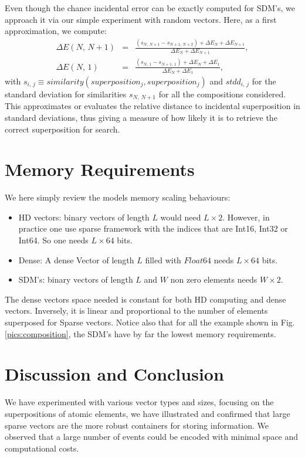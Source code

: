 \documentclass[11pt]{article}
\begin{document}
Even though the chance incidental error can be exactly
computed for SDM's, we approach it via our simple experiment with random vectors.
Here, as a first approximation, we compute:
\begin{eqnarray*}
\Delta E(N,\, N+1) &=& \frac{(s_{N,\, N+1} - s_{N+1,\, N+2}) + \Delta E_{N} + \Delta E_{N+1} } {\Delta E_{N} + \Delta E_{N+1}}, \\
\Delta E(N,\, 1) & = & \frac{(s_{N,\, 1} - s_{N+1,\, 1}) + \Delta E_{N} + \Delta E_{1}}{\Delta E_{N} + \Delta E_{1}},
\end{eqnarray*}
with $s_{i, \, j} \equiv similarity(superposition_j, superposition_{j})$ and $stdd_{i,\, j}$
for the standard deviation for similarities $s_{N, \, N+1}$ for all the  compositions considered.
This approximates or evaluates the relative distance to incidental superposition in  standard deviations, thus giving a measure of how likely it is to retrieve the correct superposition for search. 


\section{Memory Requirements}
We here simply review the models memory scaling behaviours:
\begin{itemize}
\item HD vectors: binary vectors of length $L$ would need  $L \times 2$. However, in practice one use sparse framework with the indices
that are Int16, Int32 or Int64. So one needs $L \times 64$ bits.
\item Dense: A dense Vector of length $L$ filled with $Float64$ needs $L \times 64$ bits.
\item SDM's: binary vectors of length $L$ and $W$ non zero elements needs $W \times 2$.
\end{itemize}
The dense vectors space needed is constant for both HD computing and dense vectors. Inversely, it is linear and proportional to the number of elements superposed for Sparse vectors. 
Notice also that for all the example shown in Fig.\ref{pics:composition}, the SDM's have by far the lowest memory requirements.

\section{Discussion and Conclusion}
We have experimented with various 
vector types and sizes, focusing on the superpositions of atomic elements, we have illustrated and confirmed that large sparse vectors are the more robust containers for storing information. We observed that a large number of events could be encoded with minimal space and computational costs.
\end{document}
